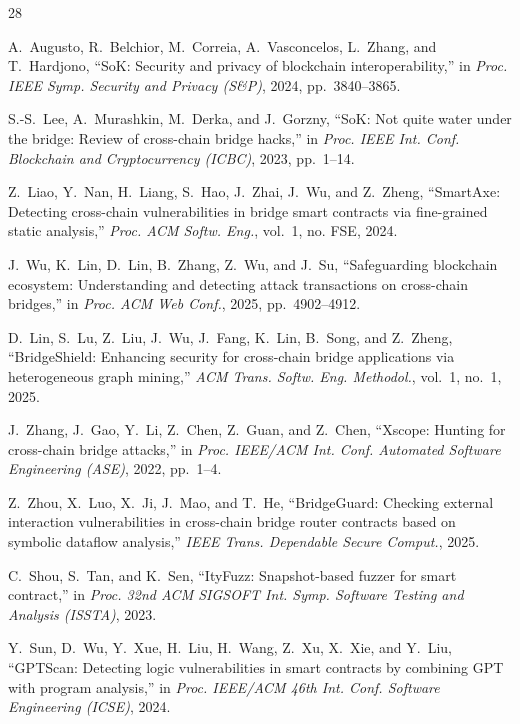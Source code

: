 \documentclass[journal]{IEEEtran}
\begin{document}

\begin{thebibliography}{28}

A.~Augusto, R.~Belchior, M.~Correia, A.~Vasconcelos, L.~Zhang, and T.~Hardjono,
``SoK: Security and privacy of blockchain interoperability,''
in \textit{Proc. IEEE Symp. Security and Privacy (S\&P)}, 2024, pp.~3840--3865.

S.-S.~Lee, A.~Murashkin, M.~Derka, and J.~Gorzny,
``SoK: Not quite water under the bridge: Review of cross-chain bridge hacks,''
in \textit{Proc. IEEE Int. Conf. Blockchain and Cryptocurrency (ICBC)}, 2023, pp.~1--14.

Z.~Liao, Y.~Nan, H.~Liang, S.~Hao, J.~Zhai, J.~Wu, and Z.~Zheng,
``SmartAxe: Detecting cross-chain vulnerabilities in bridge smart contracts via fine-grained static analysis,''
\textit{Proc. ACM Softw. Eng.}, vol.~1, no. FSE, 2024.

J.~Wu, K.~Lin, D.~Lin, B.~Zhang, Z.~Wu, and J.~Su,
``Safeguarding blockchain ecosystem: Understanding and detecting attack transactions on cross-chain bridges,''
in \textit{Proc. ACM Web Conf.}, 2025, pp.~4902--4912.

D.~Lin, S.~Lu, Z.~Liu, J.~Wu, J.~Fang, K.~Lin, B.~Song, and Z.~Zheng,
``BridgeShield: Enhancing security for cross-chain bridge applications via heterogeneous graph mining,''
\textit{ACM Trans. Softw. Eng. Methodol.}, vol.~1, no.~1, 2025.

J.~Zhang, J.~Gao, Y.~Li, Z.~Chen, Z.~Guan, and Z.~Chen,
``Xscope: Hunting for cross-chain bridge attacks,''
in \textit{Proc. IEEE/ACM Int. Conf. Automated Software Engineering (ASE)}, 2022, pp.~1--4.

Z.~Zhou, X.~Luo, X.~Ji, J.~Mao, and T.~He,
``BridgeGuard: Checking external interaction vulnerabilities in cross-chain bridge router contracts based on symbolic dataflow analysis,''
\textit{IEEE Trans. Dependable Secure Comput.}, 2025.

C.~Shou, S.~Tan, and K.~Sen,
``ItyFuzz: Snapshot-based fuzzer for smart contract,''
in \textit{Proc. 32nd ACM SIGSOFT Int. Symp. Software Testing and Analysis (ISSTA)}, 2023.

Y.~Sun, D.~Wu, Y.~Xue, H.~Liu, H.~Wang, Z.~Xu, X.~Xie, and Y.~Liu,
``GPTScan: Detecting logic vulnerabilities in smart contracts by combining GPT with program analysis,''
in \textit{Proc. IEEE/ACM 46th Int. Conf. Software Engineering (ICSE)}, 2024.


\end{thebibliography}
\end{document}
